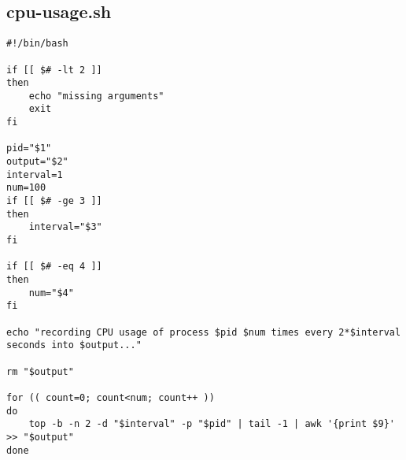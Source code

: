 \documentclass{article}
\begin{document}
\subsection{cpu-usage.sh}
\begin{verbatim}
#!/bin/bash

if [[ $# -lt 2 ]]
then
    echo "missing arguments"
    exit
fi

pid="$1"
output="$2"
interval=1
num=100
if [[ $# -ge 3 ]]
then
    interval="$3"
fi

if [[ $# -eq 4 ]]
then
    num="$4"
fi

echo "recording CPU usage of process $pid $num times every 2*$interval seconds into $output..."

rm "$output"

for (( count=0; count<num; count++ ))
do
    top -b -n 2 -d "$interval" -p "$pid" | tail -1 | awk '{print $9}' >> "$output"
done
\end{verbatim}
\end{document}
